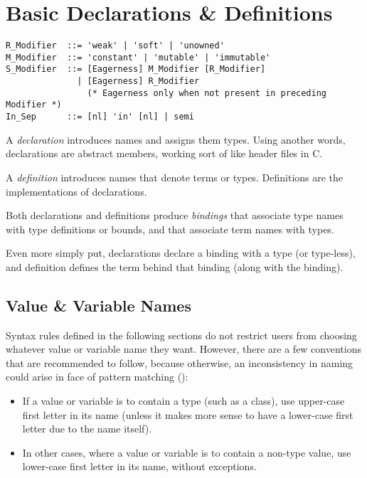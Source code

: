 
\chapter{Basic Declarations \& Definitions}

\minitoc

\newpage

\grammar\begin{lstlisting}
R_Modifier  ::= 'weak' | 'soft' | 'unowned'
M_Modifier  ::= 'constant' | 'mutable' | 'immutable'
S_Modifier  ::= [Eagerness] M_Modifier [R_Modifier]
              | [Eagerness] R_Modifier
                (* Eagerness only when not present in preceding Modifier *)
In_Sep      ::= [nl] 'in' [nl] | semi
\end{lstlisting}

A {\em declaration} introduces names and assigns them types. Using another words, declarations are abstract members, working sort of like header files in C. 

A {\em definition} introduces names that denote terms or types. Definitions are the implementations of declarations. 

Both declarations and definitions produce {\em bindings} that associate type names with type definitions or bounds, and that associate term names with types. 

Even more simply put, declarations declare a binding with a type (or type-less), and definition defines the term behind that binding (along with the binding). 





\section{Value \& Variable Names}
\label{sec:val-var-names}

Syntax rules defined in the following sections do not restrict users from choosing whatever value or variable name they want. However, there are a few conventions that are recommended to follow, because otherwise, an inconsistency in naming could arise in face of pattern matching ():

\begin{itemize}
  \item If a value or variable is to contain a type (such as a class), use upper-case first letter in its name (unless it makes more sense to have a lower-case first letter due to the name itself). 
  \item In other cases, where a value or variable is to contain a non-type value, use lower-case first letter in its name, without exceptions. 
\end{itemize}

